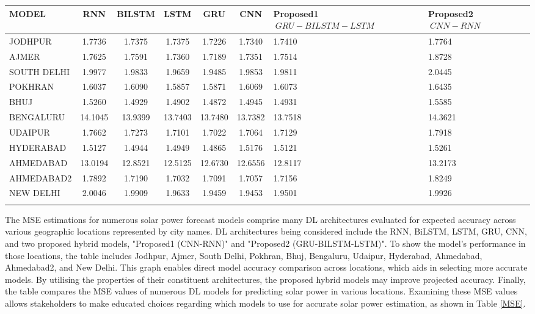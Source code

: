   \begin{table*}[!ht]
  \centering
  \setlength{\tabcolsep}{3pt}
  {\renewcommand{\arraystretch}{1}%
  \caption{MSE performances of proposed models  and traditional models}
  \begin{tabular}{|l|c|c|c|c|c|p{}|p{}|}
  \hline
  \textbf{MODEL} & \textbf{RNN} & \textbf{BILSTM} & \textbf{LSTM} & \textbf{GRU} & \textbf{CNN} &\textbf{Proposed1 \(\ GRU-BILSTM-LSTM \)\ } & \textbf{Proposed2 \(\ CNN-RNN\)\ } \\ \hline
  JODHPUR & 1.7736 & 1.7375 & 1.7375 & 1.7226 & 1.7340 & 1.7410 & 1.7764 \\ \hline
  AJMER & 1.7625 & 1.7591 & 1.7360 & 1.7189 & 1.7351 & 1.7514 & 1.8728 \\ \hline
  SOUTH DELHI & 1.9977 & 1.9833 & 1.9659 & 1.9485 & 1.9853 & 1.9811 & 2.0445 \\ \hline
  POKHRAN & 1.6037 & 1.6090 & 1.5857 & 1.5871 & 1.6069 & 1.6073 & 1.6435 \\ \hline
  BHUJ & 1.5260 & 1.4929 & 1.4902 & 1.4872 & 1.4945 & 1.4931 & 1.5585 \\ \hline
  BENGALURU & 14.1045 & 13.9399 & 13.7403 & 13.7480 & 13.7382 & 13.7518 & 14.3621 \\ \hline
  UDAIPUR & 1.7662 & 1.7273 & 1.7101 & 1.7022 & 1.7064 & 1.7129 & 1.7918 \\ \hline
  HYDERABAD & 1.5127 & 1.4944 & 1.4949 & 1.4865 & 1.5176 & 1.5121 & 1.5261 \\ \hline
  AHMEDABAD & 13.0194 & 12.8521 & 12.5125 & 12.6730 & 12.6556 & 12.8117 & 13.2173 \\ \hline
  AHMEDABAD2 & 1.7892 & 1.7190 & 1.7032 & 1.7091 & 1.7057 & 1.7156 & 1.8249 \\ \hline
  NEW DELHI & 2.0046 & 1.9909 & 1.9633 & 1.9459 & 1.9453 & 1.9501 & 1.9926 \\ \hline
  \label{MSE}
  \end{tabular}%
  }
  \end{table*}
  The MSE estimations for numerous solar power forecast models comprise many DL architectures evaluated for expected accuracy across various geographic locations represented by city names. DL architectures being considered include the RNN, BiLSTM, LSTM, GRU, CNN, and two proposed hybrid models, "Proposed1 (CNN-RNN)" and "Proposed2 (GRU-BILSTM-LSTM)". To show the model's performance in those locations, the table includes Jodhpur, Ajmer, South Delhi, Pokhran, Bhuj, Bengaluru, Udaipur, Hyderabad, Ahmedabad, Ahmedabad2, and New Delhi. This graph enables direct model accuracy comparison across locations, which aids in selecting more accurate models. By utilising the properties of their constituent architectures, the proposed hybrid models may improve projected accuracy. Finally, the table compares the MSE values of numerous DL models for predicting solar power in various locations. Examining these MSE values allows stakeholders to make educated choices regarding which models to use for accurate solar power estimation, as shown in Table \ref{MSE}.
  
